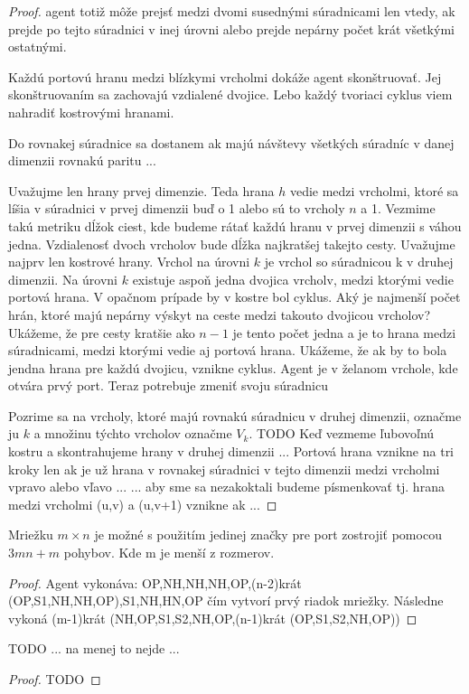 \begin{proof}
agent totiž môže prejsť medzi dvomi susednými súradnicami len vtedy, ak
prejde po tejto súradnici v inej úrovni alebo prejde nepárny počet krát
všetkými ostatnými.

Každú portovú hranu medzi blízkymi vrcholmi dokáže agent skonštruovať. Jej
skonštruovaním sa zachovajú vzdialené dvojice. Lebo každý tvoriaci cyklus
viem nahradiť kostrovými hranami.

Do rovnakej súradnice sa dostanem ak majú návštevy všetkých súradníc v danej
dimenzii rovnakú paritu ...








Uvažujme len hrany prvej dimenzie.  Teda hrana $h$ vedie medzi vrcholmi,
ktoré sa líšia v súradnici v prvej dimenzii buď o 1 alebo sú to vrcholy $n$
a 1. Vezmime takú metriku dĺžok ciest, kde budeme rátať každú
hranu v prvej dimenzii s váhou jedna. Vzdialenosť dvoch vrcholov bude dĺžka najkratšej
takejto cesty. Uvažujme najprv len kostrové hrany. Vrchol na úrovni $k$ je
vrchol so súradnicou k v druhej dimenzii. 
Na úrovni $k$ existuje aspoň jedna dvojica vrcholv, medzi ktorými vedie
portová hrana. V opačnom prípade by v kostre bol cyklus.
Aký je najmenší počet hrán, ktoré majú nepárny výskyt na ceste medzi
takouto dvojicou vrcholov?
Ukážeme, že pre cesty kratšie ako $n - 1$ je tento počet jedna a je to hrana
medzi súradnicami, medzi ktorými vedie aj portová hrana.
Ukážeme, že ak by to bola jendna hrana pre každú dvojicu, vznikne cyklus.
Agent je v želanom vrchole, kde otvára prvý port. Teraz potrebuje zmeniť
svoju súradnicu




Pozrime sa na vrcholy, ktoré majú rovnakú súradnicu v druhej dimenzii,
označme ju $k$ a množinu týchto vrcholov označme $V_{k}$. 
TODO Keď vezmeme ľubovoľnú kostru a skontrahujeme hrany v druhej dimenzii
...
Portová hrana vznikne na tri kroky len ak je už hrana v rovnakej súradnici v
tejto dimenzii medzi vrcholmi vpravo alebo vľavo ...
... aby sme sa nezakoktali budeme písmenkovať tj. hrana medzi vrcholmi
(u,v) a (u,v+1) vznikne ak ...
\end{proof}


\begin{lem}
Mriežku $m \times n$ je možné s použitím jedinej značky pre port zostrojiť
pomocou $3mn + m$ pohybov. Kde m je menší z rozmerov.
\end{lem}
\begin{proof}
Agent vykonáva: OP,NH,NH,NH,OP,(n-2)krát (OP,S1,NH,NH,OP),S1,NH,HN,OP čím
vytvorí prvý riadok mriežky. Následne vykoná
(m-1)krát (NH,OP,S1,S2,NH,OP,(n-1)krát (OP,S1,S2,NH,OP))
\end{proof}
\begin{lem}
TODO ... na menej to nejde ...
\end{lem}
\begin{proof}
TODO
\end{proof}




